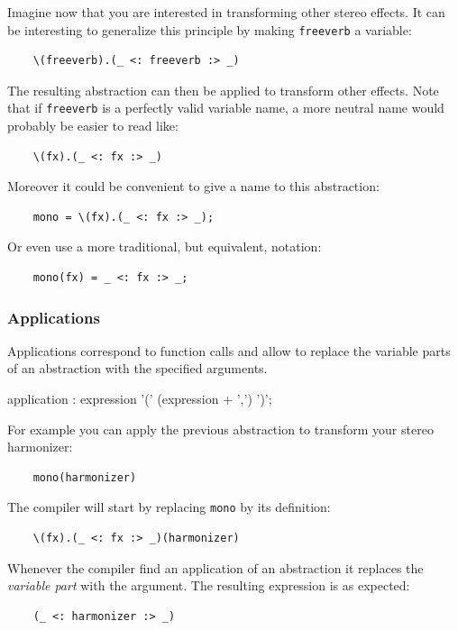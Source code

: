 Imagine now that you are interested in transforming other stereo effects. It can be interesting to generalize this principle by making \lstinline'freeverb' a variable: 
\begin{lstlisting}
	\(freeverb).(_ <: freeverb :> _)
\end{lstlisting}

The resulting abstraction can then be applied to transform other effects. Note that if \lstinline'freeverb' is a perfectly valid variable name, a more neutral name would probably be easier to read like:
\begin{lstlisting}
	\(fx).(_ <: fx :> _)
\end{lstlisting}
 
Moreover it could be convenient to give a name to this abstraction:
\begin{lstlisting}
	mono = \(fx).(_ <: fx :> _);
\end{lstlisting}

Or even use a more traditional, but equivalent, notation:
\begin{lstlisting}
	mono(fx) = _ <: fx :> _;
\end{lstlisting}

\subsubsection{Applications}
Applications correspond to function calls and allow to replace the variable parts of an abstraction with the specified arguments.

\begin{rail}
application : expression '(' (expression + ',') ')';
\end{rail}   

For example you can apply the previous abstraction to transform your stereo harmonizer:
\begin{lstlisting}
	mono(harmonizer)
\end{lstlisting}

The compiler will start by replacing \lstinline'mono' by its definition:
\begin{lstlisting}
	\(fx).(_ <: fx :> _)(harmonizer)
\end{lstlisting}

Whenever the \faust compiler find an application of an abstraction it replaces the \emph{variable part} with the argument. The resulting expression is as expected:
\begin{lstlisting}
	(_ <: harmonizer :> _)
\end{lstlisting}

